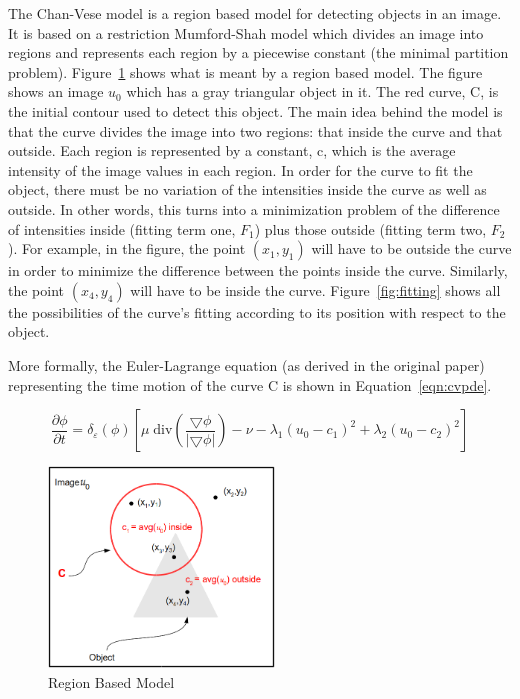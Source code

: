 \documentclass[10pt,journal,letterpaper,compsoc]{IEEEtran}
\begin{document}
The Chan-Vese model is a region based model for detecting objects in an image. It is based on a restriction Mumford-Shah model which divides an image into
regions and represents each region by a piecewise constant (the minimal partition problem). Figure~\ref{fig:region} shows what is meant by a region based
model. The figure shows an image $u_{0}$ which has a gray triangular object in it. The red curve, C, is the initial contour used to detect this object. The
main idea behind the model is that the curve divides the image into two regions: that inside the curve and that outside. Each region is represented by a
constant, c, which is the average intensity of the image values in each region. In order for the curve to fit the object, there must be no variation of the
intensities inside the curve as well as outside. In other words, this turns into a minimization problem of the difference of intensities inside (fitting term
one, $F_{1}$) plus those
outside (fitting term two, $F_{2}$). For example, in the figure, the point $(x_{1},y_{1})$ will have to be outside the curve in order to minimize the difference
between the points inside
the curve. Similarly, the point $(x_{4}, y_{4})$ will have to be inside the curve. Figure~\ref{fig:fitting} shows all the possibilities of the curve's fitting
according to its position with respect to the object.

More formally, the Euler-Lagrange equation (as derived in the original paper) representing the time motion of the curve C is shown in Equation~\ref{eqn:cvpde}.

\begin{equation}
\label{eqn:cvpde}
\frac{\partial{\phi}}{\partial{t}} = \delta_{\varepsilon}(\phi)[\mu\; \mathrm{div}(\frac{\bigtriangledown \phi}{|\bigtriangledown \phi|}) - \nu -
\lambda_{1}(u_{0} - c_{1})^2 +\lambda_{2}(u_{0} - c_{2})^2] 
\end{equation}

\begin{figure}[t]
\centering
\includegraphics[width=6cm]{explaining.png}
\caption{Region Based Model}
\label{fig:region}
\end{figure}
\end{document}
